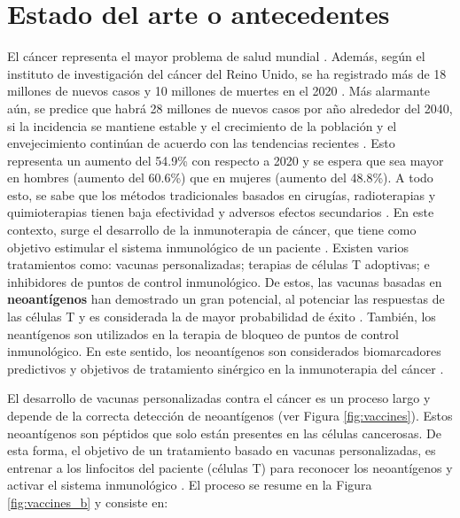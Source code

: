 \documentclass[a4paper,11pt]{article}
\begin{document}
\section{Estado del arte o antecedentes}
	
	El cáncer representa el mayor problema de salud mundial \citep{siegel2023cancer}. Además, según el instituto de investigación del cáncer del Reino Unido, se ha registrado más de 18 millones de nuevos casos y 10 millones de muertes en el 2020 \citep{cancerUK2023}. Más alarmante aún, se predice que habrá 28 millones de nuevos casos por año alrededor del 2040, si la incidencia se mantiene estable y el crecimiento de la población y el envejecimiento continúan de acuerdo con las tendencias recientes \citep{cancerUK2023_2}. Esto representa un aumento del 54.9\% con respecto a 2020 y se espera que sea mayor en hombres (aumento del 60.6\%) que en mujeres (aumento del 48.8\%).	A todo esto, se sabe que los métodos tradicionales basados en cirugías, radioterapias y quimioterapias tienen baja efectividad y adversos efectos secundarios \citep{peng2019neoantigen}. En este contexto, surge el desarrollo de la inmunoterapia de cáncer, que tiene como objetivo estimular el sistema inmunológico de un paciente \citep{borden2022cancer}. Existen varios tratamientos como: vacunas personalizadas; terapias de células T adoptivas; e inhibidores de puntos de control inmunológico. De estos, las vacunas basadas en \textbf{neoantígenos} han demostrado un gran potencial, al potenciar las respuestas de las células T y es considerada la de mayor probabilidad de éxito \citep{borden2022cancer}. También, los neantígenos son utilizados en la terapia de bloqueo de puntos de control inmunológico. En este sentido, los neoantígenos son considerados biomarcadores predictivos y objetivos de tratamiento sinérgico en la inmunoterapia del cáncer \citep{fang2022neoantigens}.
	
	
	
	
	El desarrollo de vacunas personalizadas contra el cáncer es un proceso largo y depende de la correcta detección de neoantígenos (ver Figura \ref{fig:vaccines}). Estos neoantígenos son péptidos que solo están presentes en las células cancerosas. De esta forma, el objetivo de un tratamiento basado en vacunas personalizadas, es entrenar a los linfocitos del paciente (células T) para reconocer los neoantígenos y activar el sistema inmunológico \citep{de2020neoantigen, peng2019neoantigen}. El proceso se resume en la Figura \ref{fig:vaccines_b} y consiste en: 
	
	
	
\end{document}
